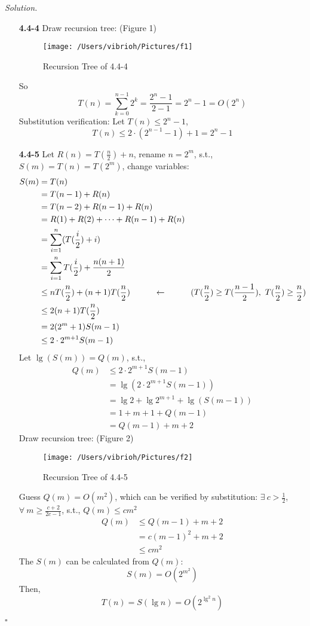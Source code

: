 \documentclass[11pt]{article}
\theoremstyle{definition}
\newenvironment{solution}{\noindent\emph{Solution.}}{\hfill$\square$}
\newcommand\tab[1][1cm]{\hspace*{#1}}
\begin{document}
\begin{solution}
\begin{enumerate}
    \item[\textbf{4.4-4}]
Draw recursion tree: (Figure 1)
    \begin{figure}[htbp]
   \centering
  \texttt{[image: /Users/vibrioh/Pictures/f1]}
  \caption{Recursion Tree of 4.4-4}
  \label{fig:shapes}
\end{figure}

So $$T(n) = \sum_{k = 0}^{n - 1} 2^k = \frac{2^n-1}{2-1} = 2^n - 1 = O(2^n)$$ 
Substitution verification: Let $T(n) \leq 2^n - 1$,
$$T(n) \leq 2 \cdot (2^{n-1}-1) + 1 = 2^n - 1$$

    \item[\textbf{4.4-5}]
 Let $R(n) = T(\frac{n}{2}) + n$, rename $n = 2^m$, s.t., $S(m) = T(n) = T(2^m)$, change variables:
 \begin{align*}
S(m) &= T(n) \\
& = T(n - 1) + R(n)\\
& = T(n - 2) + R(n-1)+R(n)\\
&=R(1) + R(2) + \cdots +R(n-1)+R(n)\\
&=\sum_{i =1}^n(T(\frac{i}{2}) + i)\\
&=\sum_{i =1}^nT(\frac{i}{2}) +\frac{n(n+1)}{2}\\
&\leq nT(\frac{n}{2}) + (n+1)T(\frac{n}{2}) \tab\leftarrow\tab  (T(\frac{n}{2}) \geq T(\frac{n-1}{2}), \ T(\frac{n}{2}) \geq \frac{n}{2}) \\
&\leq 2(n+1)T(\frac{n}{2})\\
&=2(2^m+1)S(m-1)\\
&\leq 2\cdot2^{m+1}S(m-1)
\end{align*}
Let $\lg (S(m)) = Q(m)$, s.t.,
 \begin{align*}
Q(m) &\leq 2\cdot2^{m+1}S(m-1) \\
&= \lg (2\cdot2^{m+1}S(m-1)) \\
&= \lg 2+\lg 2^{m+1}+\lg (S(m-1)) \\
&= 1+m+1 +Q(m-1)\\
&=Q(m-1)+m+2
\end{align*}
Draw recursion tree: (Figure 2)
    \begin{figure}[htbp]
  \centering
  \texttt{[image: /Users/vibrioh/Pictures/f2]}
  \caption{Recursion Tree of 4.4-5}
  \label{fig:shapes}
\end{figure}

Guess $Q(m) = O(m^2)$, which can be verified by substitution: $\exists \  c>\frac{1}{2}$, $\forall \ m \geq \frac{c+2}{2c-1}$, s.t., $Q(m) \leq cm^2$
 \begin{align*}
Q(m) &\leq Q(m-1)+m+2\\
&=c(m-1)^2 + m + 2\\
&\leq cm^2
\end{align*}
The $S(m)$ can be calculated from $Q(m)$:
$$S(m) = O(2^{m^2})$$
Then,
$$T(n) = S(\lg n) = O(2^{\lg ^2n})$$
    

\end{enumerate}
\end{solution}
\end{document}

